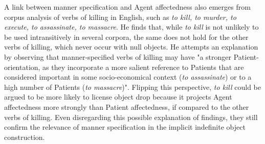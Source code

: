 A link between manner specification and Agent affectedness also emerges from  corpus analysis of verbs of killing in English, such as \textit{to kill, to murder, to execute, to assassinate, to massacre}. He finds that, while \textit{to kill} is not unlikely to be used intransitively in several corpora, the same does not hold for the other verbs of killing, which never occur with null objects. He attempts an explanation by observing that manner-specified verbs of killing may have "a stronger Patient-orientation, as they incorporate a more salient reference to Patients that are considered important in some socio-economical context (\textit{to assassinate}) or to a high number of Patients (\textit{to massacre})". Flipping this perspective, \textit{to kill} could be argued to be more likely to license object drop because it projects Agent affectedness more strongly than Patient affectedness, if compared to the other verbs of killing. Even disregarding this possible explanation of  findings, they still confirm the relevance of manner specification in the implicit indefinite object construction.

